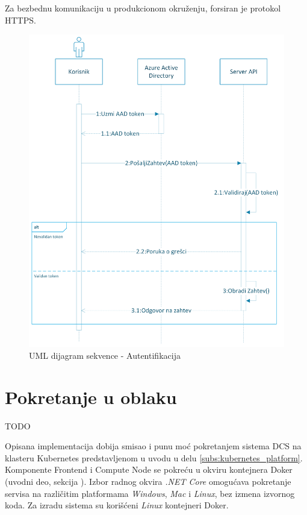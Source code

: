\documentclass[12pt,oneside]{memoir}
\begin{document}
Za bezbednu komunikaciju u produkcionom okruženju, forsiran je protokol HTTPS.

\begin{figure}[!ht]
  \centering
  \includegraphics[width=1.0\textwidth]{./images/autentikacija_uml_dijagram_sekvence.png}
  \caption{UML dijagram sekvence - Autentifikacija}
  \label{fig:autentifikacija}
\end{figure}


\section{Pokretanje u oblaku}
TODO

Opisana implementacija dobija smisao i punu moć pokretanjem sistema DCS na klasteru Kubernetes predstavljenom u uvodu u delu \ref{subs:kubernetes_platform}. Komponente Frontend i Compute Node se pokreću u okviru kontejnera Doker (uvodni deo, sekcija \label{subs:docker_platform}). Izbor radnog okvira \emph{.NET Core} omogućava pokretanje servisa na različitim platformama \emph{Windows}, \emph{Mac} i \emph{Linux}, bez izmena izvornog koda. Za izradu sistema su korišćeni \emph{Linux} kontejneri Doker.
\end{document}
